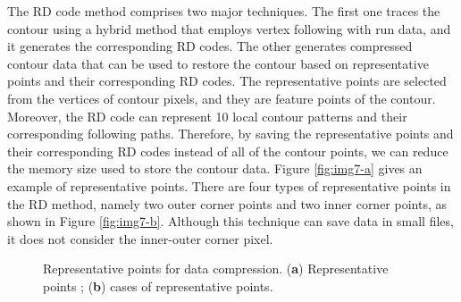 \documentclass[sensors,article,accept,moreauthors,pdftex,10pt,a4paper]{mdpi}
\begin{document}
The RD code method \cite{Miyatake1997Contour} comprises two major techniques. The first one traces the contour using a hybrid method that employs vertex following with run data, and it generates the corresponding RD codes. The other generates compressed contour data that can be used to restore the contour based on representative points and their corresponding RD codes. The representative points are selected from the vertices of contour pixels, and they are feature points of the contour. Moreover, the RD code can represent 10 local contour patterns and their corresponding following paths. Therefore, by saving the representative points and their corresponding RD codes instead of all of the contour points, we can reduce the memory size used to store the contour data. Figure \ref{fig:img7-a} \cite{Miyatake1997Contour} gives an example of representative points. There are four types of representative points in the RD method, namely two outer corner points and two inner corner points, as shown in Figure \ref{fig:img7-b}. Although this technique can save data in small files, it does not consider the inner-outer corner pixel. 

\begin{figure}[H]
	\centering
	\caption{Representative points for data compression. (\textbf{a}) Representative points \cite{Miyatake1997Contour}; (\textbf{b}) cases of representative points.}
	\label{fig:rdcode}
\end{figure}
\end{document}
